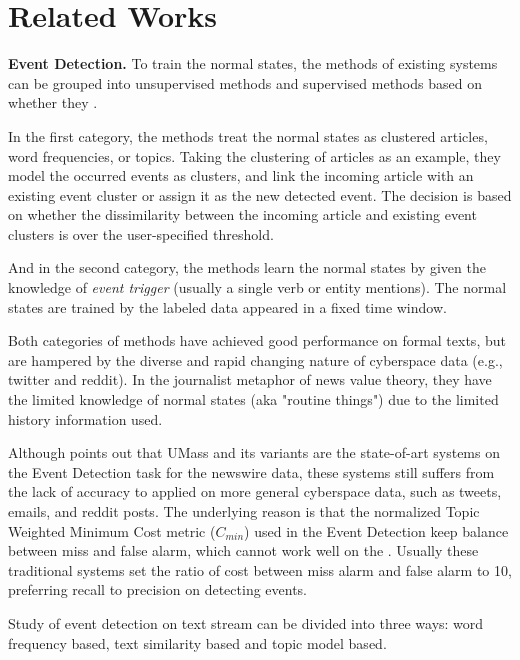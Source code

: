 \documentclass[conference,compsoc]{IEEEtran}
\begin{document}
\section{Related Works}
\textbf{Event Detection.} To train the normal states, the methods of existing systems can be grouped into unsupervised methods and supervised methods based on whether they .

In the first category, the methods treat the normal states as clustered articles\cite{Petrovic:2010uj}\cite{Wurzer:2015wq}, word frequencies\cite{Mathioudakis:2010fc}\cite{Weng:2011wz}, or topics\cite{Diao:2012wj}\cite{Yan:2015wm}. 
Taking the clustering of articles\cite{Petrovic:2010uj}\cite{Wurzer:2015wq} as an example, they model the occurred events as clusters, and link the incoming article with an existing event cluster or assign it as the new detected event.
The decision is based on whether the dissimilarity between the incoming article and existing event clusters is over the user-specified threshold. 

And in the second category, the methods learn the normal states by given the knowledge of \textit{event trigger}\cite{Li2013JointEE}\cite{Nguyen2015EventDA} (usually a single verb or entity mentions). The normal states are trained by the labeled data appeared in a fixed time window.

Both categories of methods have achieved good performance on formal texts, but are hampered by the diverse and rapid changing nature of cyberspace data (e.g., twitter\cite{Asur:2011tc} and reddit\cite{singer2014evolution}).
In the journalist metaphor of news value theory, they have the limited knowledge of normal states (aka "routine things") due to the limited history information used. 

Although \cite{Wurzer:2015wq} points out that UMass\cite{Allan:2000wu} and its variants\cite{Petrovic:2010uj}\cite{petrovic2012using}\cite{Wurzer:2015wq} are the state-of-art systems on the Event Detection task for the newswire data, these systems still suffers from the lack of accuracy to applied on more general cyberspace data, such as tweets, emails, and reddit posts. 
The underlying reason is that the normalized Topic Weighted Minimum Cost metric (\(C_{min}\)) used in the Event Detection keep balance between miss and false alarm, which cannot work well on the .
Usually these traditional systems set the ratio of cost between miss alarm and false alarm to 10, preferring recall to precision on detecting events.

Study of event detection on text stream can be divided into three ways: word frequency based, text similarity based and topic model based.
\end{document}
